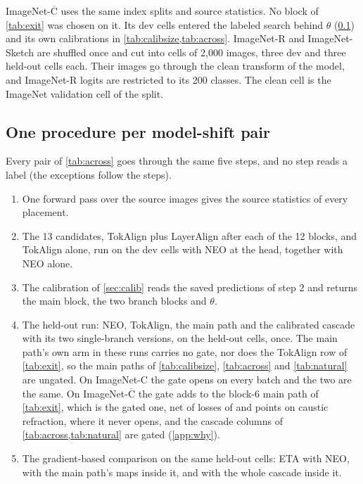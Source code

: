 \documentclass{article}
\newcommand{\tok}{TokAlign}
\newcommand{\layer}{LayerAlign}
\newcommand{\neo}{NEO}
\begin{document}
ImageNet-$\overline{\text{C}}$ \citep{mintun2021} uses the same index splits and source statistics. No block of \cref{tab:exit} was chosen on it. Its dev cells entered the labeled search behind $\theta$ (\cref{app:procedure}) and its own calibrations in \cref{tab:calibsize,tab:across}. ImageNet-R \citep{imagenetr2021} and ImageNet-Sketch \citep{sketch2019} are shuffled once and cut into cells of 2{,}000 images, three dev and three held-out cells each. Their images go through the clean transform of the model, and ImageNet-R logits are restricted to its 200 classes. The clean cell is the ImageNet validation cell of the split.

\subsection{One procedure per model-shift pair}
\label{app:procedure}
Every pair of \cref{tab:across} goes through the same five steps, and no step reads a label (the exceptions follow the steps).
\begin{enumerate}
\setlength{\itemsep}{1pt}\setlength{\topsep}{2pt}\setlength{\parsep}{0pt}
\item One forward pass over the source images gives the source statistics of every placement.
\item The 13 candidates, \tok{} plus \layer{} after each of the 12 blocks, and \tok{} alone, run on the dev cells with \neo{} at the head, together with \neo{} alone.
\item The calibration of \cref{sec:calib} reads the saved predictions of step 2 and returns the main block, the two branch blocks and $\theta$.
\item The held-out run: \neo{}, \tok{}, the main path and the calibrated cascade with its two single-branch versions, on the held-out cells, once. The main path's own arm in these runs carries no gate, nor does the \tok{} row of \cref{tab:exit}, so the main paths of \cref{tab:calibsize}, \cref{tab:across} and \cref{tab:natural} are ungated. On ImageNet-C the gate opens on every batch and the two are the same. On ImageNet-$\overline{\text{C}}$ the gate adds  to the block-6 main path of \cref{tab:exit}, which is the gated one, net of losses of  and  points on caustic refraction, where it never opens, and the cascade columns of \cref{tab:across,tab:natural} are gated (\cref{app:why}).
\item The gradient-based comparison on the same held-out cells: ETA with \neo{}, with the main path's maps inside it, and with the whole cascade inside it.
\end{enumerate}
\end{document}
